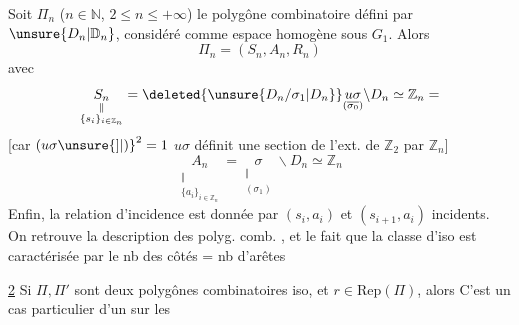 Soit $\Pi_n$ ($n\in\mathbb N$, $2\leq n\leq+\infty$) le polygône
combinatoire défini par $\unsure{D_n|\mathbb D_n}$, considéré comme
espace homogène sous $G_1$. Alors
\[
\Pi_n=(S_n,A_n,R_n)
\]
avec
\[
\underset{\substack{\Vert\\\{s_i\}_{i\in\mathbb Z_n}}}{S_n}=\deleted{\unsure{D_n/\sigma_1|D_n}}\underset{(\overline{\sigma_0})}{u\sigma}\backslash D_n\simeq\mathbb Z_n=
\]
[car $(u\sigma{\unsure{]|)}}^2=1$  $u\sigma$ définit une section
de l'ext. de $\mathbb Z_2$ par $\mathbb Z_n$]
\[
\underset{\substack{\Vert\\\{a_i\}_{i\in\mathbb Z_n}}}{A_n}=\underset{\substack{\Vert\\(\sigma_1)}}{\sigma}\backslash D_n\simeq\mathbb Z_n
\]
Enfin, la relation d'incidence est donnée
par \qquad $(s_i,a_i)$ et $(s_{i+1},a_i)$ incidents.
On retrouve la description des polyg. comb.
, et le fait que la classe d'iso est
caractérisée par le nb des côtés = nb d'arêtes

\uline{ 2} Si $\Pi,\Pi'$ sont deux polygônes
combinatoires iso,  et $r\in\mathrm{Rep}(\Pi)$,
alors
C'est un cas particulier d'un  sur les
